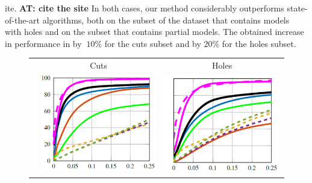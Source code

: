 \documentclass[10pt,twocolumn,letterpaper]{article}
\newcommand{\colornote}[3]{{\color{#1}\bf{#2: #3}\normalfont}}
\newcommand{\colornote}[3]{}
\newcommand {\ayellet}[1]{\colornote{blue}{AT}{#1}}
\begin{document}
ite. \ayellet{cite the site}
In both cases, our method considerably outperforms state-of-the-art algorithms, both on the subset of the dataset that contains models with holes and on the subset that contains partial models.
The obtained increase in performance in by $~10\%$ for the cuts subset and by $20\%$ for the holes subset.

\begin{figure}[htb]
	\centering
		\setlength\tabcolsep{0.5pt}
	\begin{tabular}{ccc}
		& Cuts & Holes \\
		\rotatebox{90}{    \, \% Correspondences} &
		\includegraphics[scale=0.35]{figures/SHRECCutsCumulative16.png} & \includegraphics[scale=0.35]{figures/SHRECHolesCumulative16.png} \\

\end{tabular}
\end{figure}
\end{document}
